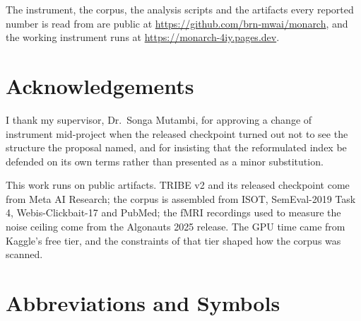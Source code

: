 The instrument, the corpus, the analysis scripts and the artifacts every reported number is
read from are public at \url{https://github.com/brn-mwai/monarch}, and the working instrument
runs at \url{https://monarch-4iy.pages.dev}.

\chapter*{Acknowledgements}

I thank my supervisor, Dr.\ Songa Mutambi, for approving a change of instrument mid-project
when the released checkpoint turned out not to see the structure the proposal named, and for
insisting that the reformulated index be defended on its own terms rather than presented as a
minor substitution.

This work runs on public artifacts. TRIBE v2 and its released checkpoint come from Meta AI
Research; the corpus is assembled from ISOT, SemEval-2019 Task 4, Webis-Clickbait-17 and
PubMed; the fMRI recordings used to measure the noise ceiling come from the Algonauts 2025
release. The GPU time came from Kaggle's free tier, and the constraints of that tier shaped
how the corpus was scanned.

\tableofcontents

\listoffigures
{}

\listoftables
{}

\chapter*{Abbreviations and Symbols}

